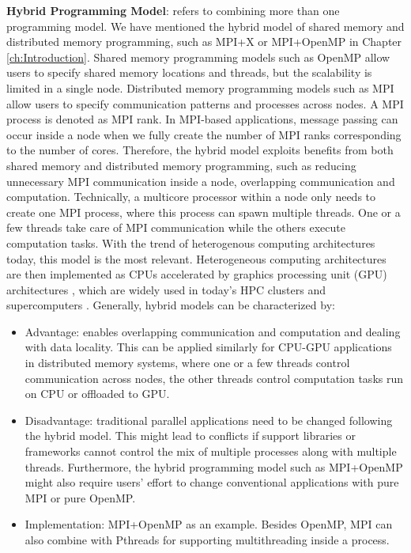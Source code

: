 \noindent \textbf{Hybrid Programming Model}: refers to combining more than one programming model. We have mentioned the hybrid model of shared memory and distributed memory programming, such as MPI+X or MPI+OpenMP \cite{rabenseifner2009hybrid} in Chapter \ref{ch:Introduction}. Shared memory programming models such as OpenMP allow users to specify shared memory locations and threads, but the scalability is limited in a single node. Distributed memory programming models such as MPI allow users to specify communication patterns and processes across nodes. A MPI process is denoted as MPI rank. In MPI-based applications, message passing can occur inside a node when we fully create the number of MPI ranks corresponding to the number of cores. Therefore, the hybrid model exploits benefits from both shared memory and distributed memory programming, such as reducing unnecessary MPI communication inside a node, overlapping communication and computation. Technically, a multicore processor within a node only needs to create one MPI process, where this process can spawn multiple threads. One or a few threads take care of MPI communication while the others execute computation tasks. With the trend of heterogenous computing architectures today, this model is the most relevant. Heterogeneous computing architectures are then implemented as CPUs accelerated by graphics processing unit (GPU) architectures \cite{zhang2011gpumodel}, which are widely used in today's HPC clusters and supercomputers \cite{top500list}. Generally, hybrid models can be characterized by:
\begin{itemize}
	\item Advantage: enables overlapping communication and computation and dealing with data locality. This can be applied similarly for CPU-GPU applications in distributed memory systems, where one or a few threads control communication across nodes, the other threads control computation tasks run on CPU or offloaded to GPU.
	\item Disadvantage: traditional parallel applications need to be changed following the hybrid model. This might lead to conflicts if support libraries or frameworks cannot control the mix of multiple processes along with multiple threads. Furthermore, the hybrid programming model such as MPI+OpenMP might also require users' effort to change conventional applications with pure MPI or pure OpenMP.
	\item Implementation: MPI+OpenMP as an example. Besides OpenMP, MPI can also combine with Pthreads for supporting multithreading inside a process.
\end{itemize}

